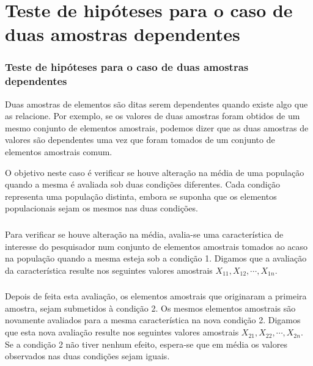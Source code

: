 \documentclass[14pt,aspectratio=1610]{beamer}
\begin{document}
\section{Teste de hipóteses para o caso de duas amostras dependentes}
\begin{frame}{}
\frametitle{Teste de hipóteses para o caso de duas amostras dependentes}
\begin{block}{}
\justifying
Duas amostras de elementos são ditas serem dependentes quando existe algo que as relacione. Por exemplo, se os valores de duas amostras foram obtidos de um mesmo conjunto de elementos amostrais, podemos dizer que as duas amostras de valores são dependentes uma vez que foram tomados de um conjunto de elementos
amostrais comum.
\end{block}
\pause
\begin{block}{}
\justifying
O objetivo neste caso é verificar se houve alteração na média de uma população
quando a mesma é avaliada sob duas condições diferentes. Cada condição representa
uma população distinta, embora se suponha que os elementos populacionais sejam os
mesmos nas duas condições.
\end{block}
\end{frame}

\begin{frame}{}
\frametitle{}
\begin{block}{}
\justifying
Para verificar se houve alteração na média, avalia-se uma característica de interesse do pesquisador num conjunto de elementos amostrais tomados ao acaso na população quando a mesma esteja sob a condição 1. Digamos que a avaliação da característica resulte nos seguintes valores amostrais $X_{11},X_{12},\cdots,X_{1n}$.
\end{block}
\end{frame}

\begin{frame}{}
\frametitle{}
\begin{block}{}
\justifying
Depois de feita esta avaliação, os elementos amostrais que originaram a primeira amostra, sejam submetidos à condição 2. Os mesmos elementos amostrais são novamente avaliados para a mesma característica na nova condição 2. Digamos que esta nova avaliação resulte nos seguintes valores amostrais $X_{21},X_{22},\cdots,X_{2n}$. 
Se a condição 2 não tiver nenhum efeito, espera-se que em média os valores observados nas duas condições sejam iguais.
\end{block}
\end{frame}
\end{document}
